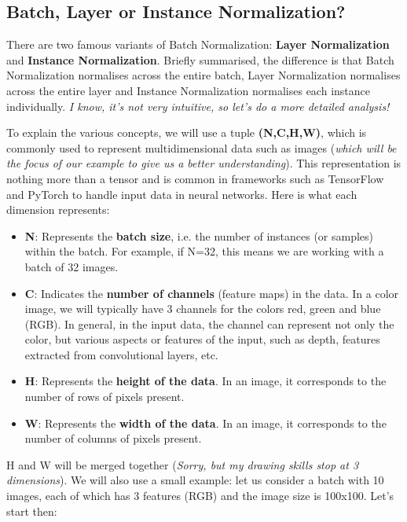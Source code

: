 \subsection{Batch, Layer or Instance Normalization?}

There are two famous variants of Batch Normalization: \textbf{Layer Normalization} and \textbf{Instance Normalization}. Briefly summarised, the difference is that Batch Normalization normalises across the entire batch, Layer Normalization normalises across the entire layer and Instance Normalization normalises each instance individually. \textit{I know, it's not very intuitive, so let's do a more detailed analysis!}

To explain the various concepts, we will use a tuple \textbf{(N,C,H,W)}, which is commonly used to represent multidimensional data such as images (\textit{which will be the focus of our example to give us a better understanding}). This representation is nothing more than a tensor and is common in frameworks such as TensorFlow and PyTorch to handle input data in neural networks. Here is what each dimension represents:
\begin{itemize}
    \item \textbf{N}: Represents the \textbf{batch size}, i.e. the number of instances (or samples) within the batch. For example, if N=32, this means we are working with a batch of 32 images.
    \item \textbf{C}: Indicates the \textbf{number of channels} (feature maps) in the data. In a color image, we will typically have 3 channels for the colors red, green and blue (RGB). In general, in the input data, the channel can represent not only the color, but various aspects or features of the input, such as depth, features extracted from convolutional layers, etc.
    \item \textbf{H}: Represents the \textbf{height of the data}. In an image, it corresponds to the number of rows of pixels present.
    \item \textbf{W}: Represents the \textbf{width of the data}. In an image, it corresponds to the number of columns of pixels present.
\end{itemize}
H and W will be merged together (\textit{Sorry, but my drawing skills stop at 3 dimensions}).
We will also use a small example: let us consider a batch with 10 images, each of which has 3 features (RGB) and the image size is 100x100. Let's start then:


